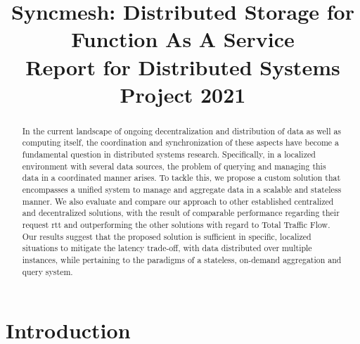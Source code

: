 \documentclass[conference]{IEEEtran}
\begin{document}
\title{Syncmesh: Distributed Storage for \\Function As A Service\\
{\footnotesize Report for Distributed Systems Project 2021}
}

\author{
\and
{}
\and
{}
}

\maketitle

\begin{abstract}
In the current landscape of ongoing decentralization and distribution of data as well as computing itself, the coordination and synchronization of these aspects have become a fundamental question in distributed systems research. Specifically, in a localized environment with several data sources, the problem of querying and managing this data in a coordinated manner arises. To tackle this, we propose a custom solution that encompasses a unified system to manage and aggregate data in a scalable and stateless manner. We also evaluate and compare our approach to other established centralized and decentralized solutions, with the result of comparable performance regarding their request \acl{rtt} and outperforming the other solutions with regard to Total Traffic Flow. Our results suggest that the proposed solution is sufficient in specific, localized situations to mitigate the latency trade-off, with data distributed over multiple instances, while pertaining to the paradigms of a stateless, on-demand aggregation and query system.
\end{abstract}


\section{Introduction}\label{Chap:Introduction}
\end{document}
